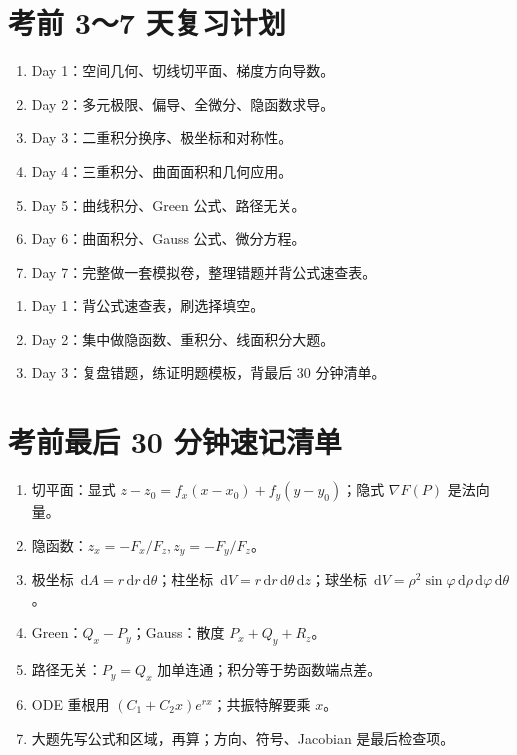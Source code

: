\documentclass[UTF8,zihao=-4]{ctexart}
\newcommand{\dd}{\,\mathrm d}
\newcommand{\grad}{\nabla}
\begin{document}
\section{考前 3～7 天复习计划}
\begin{methodbox}[7 天版]
\begin{enumerate}
  \item Day 1：空间几何、切线切平面、梯度方向导数。
  \item Day 2：多元极限、偏导、全微分、隐函数求导。
  \item Day 3：二重积分换序、极坐标和对称性。
  \item Day 4：三重积分、曲面面积和几何应用。
  \item Day 5：曲线积分、Green 公式、路径无关。
  \item Day 6：曲面积分、Gauss 公式、微分方程。
  \item Day 7：完整做一套模拟卷，整理错题并背公式速查表。
\end{enumerate}
\end{methodbox}

\begin{methodbox}[3 天版]
\begin{enumerate}
  \item Day 1：背公式速查表，刷选择填空。
  \item Day 2：集中做隐函数、重积分、线面积分大题。
  \item Day 3：复盘错题，练证明题模板，背最后 30 分钟清单。
\end{enumerate}
\end{methodbox}

\section{考前最后 30 分钟速记清单}
\begin{keybox}[只看这些]
\begin{enumerate}
  \item 切平面：显式 $z-z_0=f_x(x-x_0)+f_y(y-y_0)$；隐式 $\grad F(P)$ 是法向量。
  \item 隐函数：$z_x=-F_x/F_z,z_y=-F_y/F_z$。
  \item 极坐标 $\dd A=r\dd r\dd\theta$；柱坐标 $\dd V=r\dd r\dd\theta\dd z$；球坐标 $\dd V=\rho^2\sin\varphi\dd\rho\dd\varphi\dd\theta$。
  \item Green：$Q_x-P_y$；Gauss：散度 $P_x+Q_y+R_z$。
  \item 路径无关：$P_y=Q_x$ 加单连通；积分等于势函数端点差。
  \item ODE 重根用 $(C_1+C_2x)e^{rx}$；共振特解要乘 $x$。
  \item 大题先写公式和区域，再算；方向、符号、Jacobian 是最后检查项。
\end{enumerate}
\end{keybox}
\end{document}
